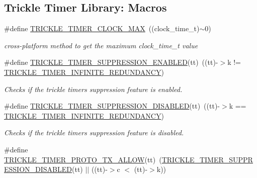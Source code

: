 \subsection*{Trickle Timer Library\+: Macros}
\begin{DoxyCompactItemize}
\item 
\hypertarget{group__trickle-timer_ga8c327f7f935dcc95d89fcbbc664fcdcf}{}\#define \hyperlink{group__trickle-timer_ga8c327f7f935dcc95d89fcbbc664fcdcf}{T\+R\+I\+C\+K\+L\+E\+\_\+\+T\+I\+M\+E\+R\+\_\+\+C\+L\+O\+C\+K\+\_\+\+M\+A\+X}~((clock\+\_\+time\+\_\+t)$\sim$0)\label{group__trickle-timer_ga8c327f7f935dcc95d89fcbbc664fcdcf}

\begin{DoxyCompactList}\small\item\em cross-\/platform method to get the maximum clock\+\_\+time\+\_\+t value \end{DoxyCompactList}\item 
\#define \hyperlink{group__trickle-timer_ga5f4e1c6f73eb9c0a18db8434d7103bd6}{T\+R\+I\+C\+K\+L\+E\+\_\+\+T\+I\+M\+E\+R\+\_\+\+S\+U\+P\+P\+R\+E\+S\+S\+I\+O\+N\+\_\+\+E\+N\+A\+B\+L\+E\+D}(tt)~((tt)-\/$>$k != \hyperlink{group__trickle-timer_ga72117b57dd1e192ca8a016055d2310f3}{T\+R\+I\+C\+K\+L\+E\+\_\+\+T\+I\+M\+E\+R\+\_\+\+I\+N\+F\+I\+N\+I\+T\+E\+\_\+\+R\+E\+D\+U\+N\+D\+A\+N\+C\+Y})
\begin{DoxyCompactList}\small\item\em Checks if the trickle timer\textquotesingle{}s suppression feature is enabled. \end{DoxyCompactList}\item 
\#define \hyperlink{group__trickle-timer_ga2c3a5dfb5c0f102b1c9755c303620004}{T\+R\+I\+C\+K\+L\+E\+\_\+\+T\+I\+M\+E\+R\+\_\+\+S\+U\+P\+P\+R\+E\+S\+S\+I\+O\+N\+\_\+\+D\+I\+S\+A\+B\+L\+E\+D}(tt)~((tt)-\/$>$k == \hyperlink{group__trickle-timer_ga72117b57dd1e192ca8a016055d2310f3}{T\+R\+I\+C\+K\+L\+E\+\_\+\+T\+I\+M\+E\+R\+\_\+\+I\+N\+F\+I\+N\+I\+T\+E\+\_\+\+R\+E\+D\+U\+N\+D\+A\+N\+C\+Y})
\begin{DoxyCompactList}\small\item\em Checks if the trickle timer\textquotesingle{}s suppression feature is disabled. \end{DoxyCompactList}\item 
\#define \hyperlink{group__trickle-timer_ga2b39325309fb89efa3b965437a249bef}{T\+R\+I\+C\+K\+L\+E\+\_\+\+T\+I\+M\+E\+R\+\_\+\+P\+R\+O\+T\+O\+\_\+\+T\+X\+\_\+\+A\+L\+L\+O\+W}(tt)~(\hyperlink{group__trickle-timer_ga2c3a5dfb5c0f102b1c9755c303620004}{T\+R\+I\+C\+K\+L\+E\+\_\+\+T\+I\+M\+E\+R\+\_\+\+S\+U\+P\+P\+R\+E\+S\+S\+I\+O\+N\+\_\+\+D\+I\+S\+A\+B\+L\+E\+D}(tt) $\vert$$\vert$ ((tt)-\/$>$c $<$ (tt)-\/$>$k))
$$
\end{DoxyCompactItemize}
